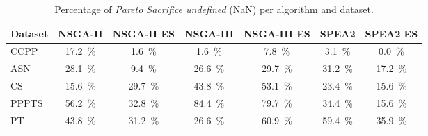 \begin{table}[ht]
\centering
\caption{Percentage of \textit{Pareto Sacrifice undefined} (NaN) per algorithm and dataset.}
\label{tab:pareto_sacrifice_undefined_nsga-iinsga-ii esnsga-iiinsga-iii esspea2spea2 es}
\begin{tabular}{lcccccc}
\hline
Dataset & NSGA-II & NSGA-II ES & NSGA-III & NSGA-III ES & SPEA2 & SPEA2 ES \\
\hline
CCPP & 17.2~\% & 1.6~\% & 1.6~\% & 7.8~\% & 3.1~\% & 0.0~\% \\
ASN & 28.1~\% & 9.4~\% & 26.6~\% & 29.7~\% & 31.2~\% & 17.2~\% \\
CS & 15.6~\% & 29.7~\% & 43.8~\% & 53.1~\% & 23.4~\% & 15.6~\% \\
PPPTS & 56.2~\% & 32.8~\% & 84.4~\% & 79.7~\% & 34.4~\% & 15.6~\% \\
PT & 43.8~\% & 31.2~\% & 26.6~\% & 60.9~\% & 59.4~\% & 35.9~\% \\
\hline
\end{tabular}
\end{table}